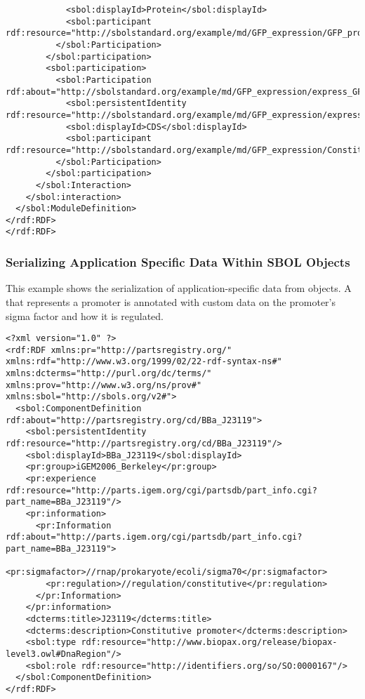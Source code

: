\begin{lstlisting}
            <sbol:displayId>Protein</sbol:displayId>
            <sbol:participant rdf:resource="http://sbolstandard.org/example/md/GFP_expression/GFP_protein"/>
          </sbol:Participation>
        </sbol:participation>
        <sbol:participation>
          <sbol:Participation rdf:about="http://sbolstandard.org/example/md/GFP_expression/express_GFP/CDS">
            <sbol:persistentIdentity rdf:resource="http://sbolstandard.org/example/md/GFP_expression/express_GFP/CDS"/>
            <sbol:displayId>CDS</sbol:displayId>
            <sbol:participant rdf:resource="http://sbolstandard.org/example/md/GFP_expression/Constitutive_GFP"/>
          </sbol:Participation>
        </sbol:participation>
      </sbol:Interaction>
    </sbol:interaction>
  </sbol:ModuleDefinition>
</rdf:RDF>
</rdf:RDF>
\end{lstlisting}

\subsubsection{Serializing Application Specific Data Within SBOL Objects}
This example shows the serialization of application-specific data from  objects. A  that represents a promoter is annotated with custom data on the promoter's sigma factor and how it is regulated.
\begin{lstlisting}
<?xml version="1.0" ?>
<rdf:RDF xmlns:pr="http://partsregistry.org/" xmlns:rdf="http://www.w3.org/1999/02/22-rdf-syntax-ns#" xmlns:dcterms="http://purl.org/dc/terms/" xmlns:prov="http://www.w3.org/ns/prov#" xmlns:sbol="http://sbols.org/v2#">
  <sbol:ComponentDefinition rdf:about="http://partsregistry.org/cd/BBa_J23119">
    <sbol:persistentIdentity rdf:resource="http://partsregistry.org/cd/BBa_J23119"/>
    <sbol:displayId>BBa_J23119</sbol:displayId>
    <pr:group>iGEM2006_Berkeley</pr:group>
    <pr:experience rdf:resource="http://parts.igem.org/cgi/partsdb/part_info.cgi?part_name=BBa_J23119"/>
    <pr:information>
      <pr:Information rdf:about="http://parts.igem.org/cgi/partsdb/part_info.cgi?part_name=BBa_J23119">
        <pr:sigmafactor>//rnap/prokaryote/ecoli/sigma70</pr:sigmafactor>
        <pr:regulation>//regulation/constitutive</pr:regulation>
      </pr:Information>
    </pr:information>
    <dcterms:title>J23119</dcterms:title>
    <dcterms:description>Constitutive promoter</dcterms:description>
    <sbol:type rdf:resource="http://www.biopax.org/release/biopax-level3.owl#DnaRegion"/>
    <sbol:role rdf:resource="http://identifiers.org/so/SO:0000167"/>
  </sbol:ComponentDefinition>
</rdf:RDF>
\end{lstlisting}

